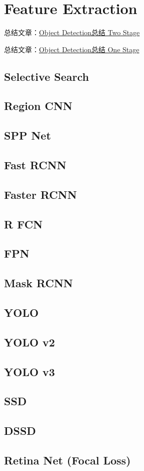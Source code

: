 \chapter{Feature Extraction}

总结文章：\href{https://zhuanlan.zhihu.com/p/35724768}{Object Detection总结 Two Stage}

总结文章：\href{https://zhuanlan.zhihu.com/p/35731743}{Object Detection总结 One Stage}

\section{Selective Search}





\section{Region CNN}

\section{SPP Net}


\section{Fast RCNN}

\section{Faster RCNN}

\section{R FCN}


\section{FPN}


\section{Mask RCNN}


\section{YOLO}


\section{YOLO v2}


\section{YOLO v3}


\section{SSD}


\section{DSSD}


\section{Retina Net (Focal Loss)}

